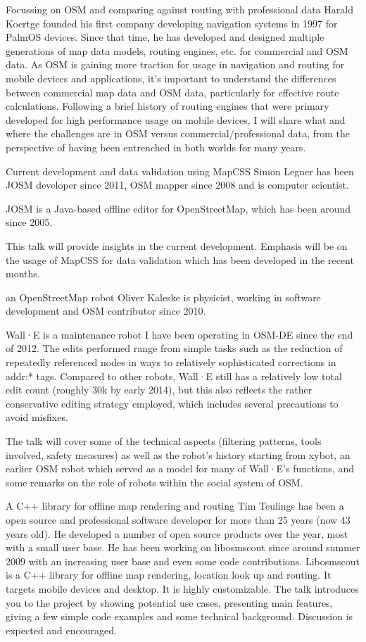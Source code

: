 %
{Focussing on OSM and comparing against routing with professional data}%
{Harald Koertge founded his first company developing navigation systems in 1997 for PalmOS devices. Since that time, he has developed and designed multiple generations of map data models, routing engines, etc. for commercial and OSM data.}%
{As OSM is gaining more traction for usage in navigation and routing for mobile devices and applications, it’s important to understand the differences between commercial map data and OSM data, particularly for effective route calculations. Following a brief history of routing engines that were primary developed for high performance usage on mobile devices, I will share what and where the challenges are in OSM versus commercial/professional data, from the perspective of having been entrenched in both worlds for many years.}

%
{Current development and data validation using MapCSS}%
{Simon Legner has been JOSM developer since 2011, OSM mapper since 2008 and is computer scientist.}%
{JOSM is a Java-based offline editor for OpenStreetMap, which has been around since 2005.

This talk will provide insights in the current development. Emphasis will be on the usage of MapCSS for data validation which has been developed in the recent months.}

%
{an OpenStreetMap robot}%
{Oliver Kaleske is physicist, working in software development and OSM contributor since 2010.}%
{Wall·E is a maintenance robot I have been operating in OSM-DE since the end of 2012. The edits performed range from simple tasks such as the reduction of repeatedly referenced nodes in
ways to relatively sophisticated corrections in addr:* tags. Compared to other robots, Wall·E still has a relatively low total edit count (roughly 30k by early 2014), but this also
reflects the rather conservative editing strategy employed, which includes several precautions to avoid misfixes.

The talk will cover some of the technical aspects (filtering patterns, tools involved, safety measures) as well as the robot's history starting from xybot, an earlier OSM robot which served as
a model for many of Wall·E's functions, and some remarks on the role of robots within the social system of OSM.}

%
{A C++ library for offline map rendering and routing}%
{Tim Teulings has been a open source and professional software developer for more than 25 years (now 43 years old). He developed a number of open source products over the year, most with a small user base. He has been working on libosmscout since around summer 2009 with an increasing user base and even some code contributions.}%
{Libosmscout is a C++ library for offline map rendering, location look up and routing. It targets mobile devices and desktop. It is highly customizable.
The talk introduces you to the project by showing potential use cases, presenting main features, giving a few simple code examples and some technical background. Discussion is expected and encouraged.}


